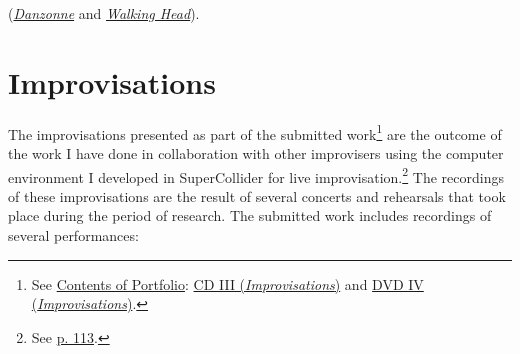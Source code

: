 (\href{http://www.federicoreuben.com/media/audio/mp3/Sporcizia_Accademica/contents/15%20Danzonne.mp3}{\emph{Danzonne}} and \href{http://www.federicoreuben.com/media/audio/mp3/Sporcizia_Accademica/contents/13%20Walking%20Head.mp3}{\emph{Walking Head}}).

\section{Improvisations}

The improvisations presented as part of the submitted work\footnote{See \hyperlink{portfolio}{Contents of Portfolio}: \href{http://www.federicoreuben.com/phd/?page_id=162}{CD III (\emph{Improvisations})} and \href{http://www.federicoreuben.com/phd/improvisations}{DVD IV (\emph{Improvisations})}.} are the outcome of the work I have done in collaboration with other improvisers using the computer environment I developed in SuperCollider for live improvisation.\footnote{See \hyperlink{improvprog}{p. 113}.} The recordings of these improvisations are the result of several concerts and rehearsals that took place during the period of research. The submitted work includes recordings of several performances:
